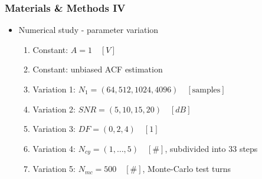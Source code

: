 \documentclass[11pt,aspectratio=169]{beamer}
\begin{document}
	\begin{frame}
		\frametitle{Materials \& Methods IV}
		\begin{itemize}
			\setlength\itemsep{0.5em}
			\item \textcolor{RIPtitlecol}{Numerical study - parameter variation}
			\begin{enumerate}
				\setlength\itemsep{0.5em}
				\item Constant: $A = 1 \quad [V]$
				\item Constant: unbiased ACF estimation
				\item Variation 1: $N_1 = (64, 512, 1024, 4096) \quad [\text{samples}]$
				\item Variation 2: $SNR = (5, 10, 15, 20) \quad [dB]$
				\item Variation 3: $DF = (0, 2, 4) \quad [1]$
				\item Variation 4: $N_{cy} = (1,\ldots,5) \quad [\#]$, subdivided into 33 steps
				\item Variation 5: $N_{mc} = 500 \quad [\#]$, Monte-Carlo test turns
			\end{enumerate}
		\end{itemize}
		\vspace*{.5em}
	\end{frame}
\end{document}
